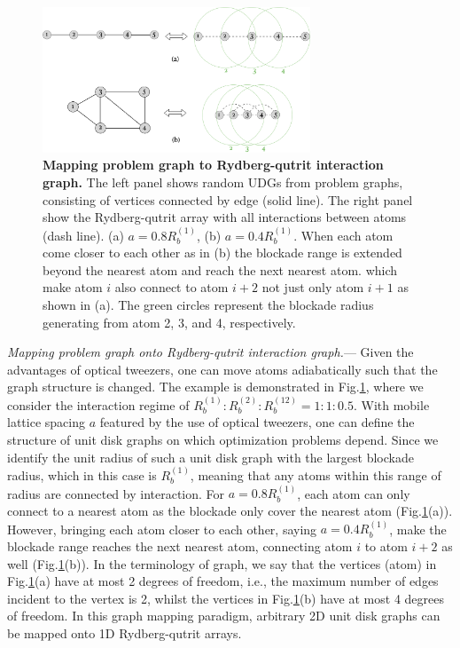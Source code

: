 \documentclass[%
 reprint,
nofootinbib,
 amsmath,amssymb,
 aps,
pra,
floatfix,
]{revtex4-2}
\begin{document}
\begin{figure}[ht!]
    \centering
    \includegraphics[width=8cm]{picture/graph_mapping.png}
    \caption{\textbf{Mapping problem graph to Rydberg-qutrit interaction graph.} The left panel shows random UDGs from problem graphs, consisting of vertices connected by edge (solid line). The right panel show the Rydberg-qutrit array with all interactions between atoms (dash line). (a) $a = 0.8R^{(1)}_b$,  (b) $a=0.4R^{(1)}_b$. When each atom come closer to each other as in (b) the blockade range is extended beyond the nearest atom and reach the next nearest atom. which make atom $i$ also connect to atom $i+2$ not just only atom $i+1$ as shown in (a). The green circles represent the blockade radius generating from atom 2, 3, and 4, respectively.}
    \label{fig:graph_mapping}
\end{figure}
\emph{Mapping problem graph onto Rydberg-qutrit interaction graph.}--- Given the advantages of optical tweezers, one can move atoms adiabatically such that the graph structure is changed. The example is demonstrated in Fig.\ref{fig:graph_mapping}, where we consider the interaction regime of $R^{(1)}_b:R^{(2)}_b:R^{(12)}_b=1:1:0.5$. With mobile lattice spacing $a$ featured by the use of optical tweezers, one can define the structure of unit disk graphs on which optimization problems depend. Since we identify the unit radius of such a unit disk graph with the largest blockade radius, which in this case is $R^{(1)}_b$, meaning that any atoms within this range of radius are connected by interaction. For $a = 0.8R^{(1)}_b$, each atom can only connect to a nearest atom as the blockade only cover the nearest atom (Fig.\ref{fig:graph_mapping}(a)). However, bringing each atom closer to each other, saying $a = 0.4R^{(1)}_b$, make the blockade range reaches the next nearest atom, connecting atom $i$ to atom $i+2$ as well (Fig.\ref{fig:graph_mapping}(b)). In the terminology of graph, we say that the vertices (atom) in Fig.\ref{fig:graph_mapping}(a) have at most 2 degrees of freedom, i.e., the maximum number of edges incident to the vertex is 2, whilst the vertices in Fig.\ref{fig:graph_mapping}(b) have at most 4 degrees of freedom. In this graph mapping paradigm, arbitrary 2D unit disk graphs can be mapped onto 1D Rydberg-qutrit arrays. 
\end{document}
